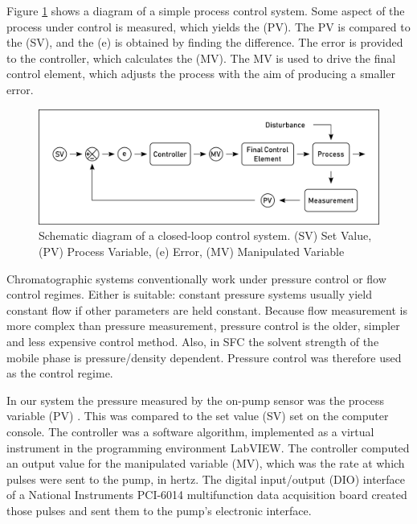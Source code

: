 Figure \ref{fig:processcontrol} shows a diagram of a simple process control
system. Some aspect of the process under control is measured, which yields the
 (PV). The PV is compared to the 
(SV), and the  (e) is obtained by finding the difference. The error
is provided to the controller, which calculates the  (MV). The MV is used to drive the final control element, which adjusts
the process with the aim of producing a smaller error.

\begin{figure}
\centering
\includegraphics[width=\textwidth]{Figures/ProcessControl.pdf}
\decoRule

\caption[A process control system]{Schematic diagram of a closed-loop control
system. (SV) Set Value, (PV) Process Variable, (e) Error, (MV) Manipulated
Variable}

\label{fig:processcontrol}
\end{figure}

Chromatographic systems conventionally work under pressure control or flow
control regimes. Either is suitable: constant pressure systems usually yield
constant flow if other parameters are held constant. Because flow measurement is
more complex than pressure measurement, pressure control is the older, simpler
and less expensive control method. Also, in SFC the solvent strength of the
mobile phase is pressure/density dependent. Pressure control was therefore used
as the control regime.

In our system the pressure measured by the on-pump sensor was the process
variable (PV) . This was compared to the set value (SV) set on the computer
console. The controller was a software algorithm, implemented as a virtual
instrument in the programming environment LabVIEW. The controller computed an
output value for the manipulated variable (MV), which was the rate at which
pulses were sent to the pump, in hertz. The digital input/output (DIO) interface
of a National Instruments PCI-6014 multifunction data acquisition board created
those pulses and sent them to the pump's electronic interface.

